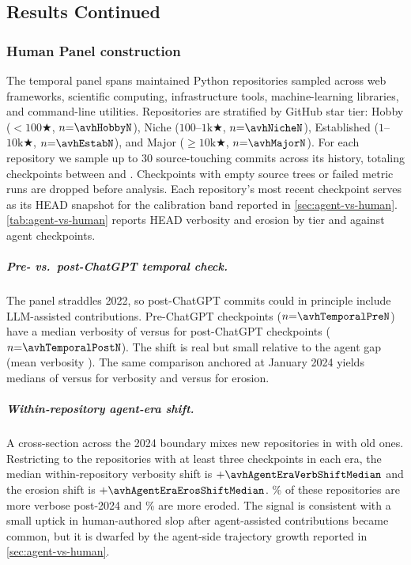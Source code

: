 \subsection{Results Continued}\label{sec:human-repo-panel}




\subsubsection{Human Panel construction}

The temporal panel spans \avhPanelN{} maintained Python repositories sampled across web frameworks, scientific computing, infrastructure tools, machine-learning libraries, and command-line utilities. Repositories are stratified by GitHub star tier: Hobby ($<100\bigstar$, $n{=}\avhHobbyN$), Niche ($100$--$1\text{k}\bigstar$, $n{=}\avhNicheN$), Established ($1$--$10\text{k}\bigstar$, $n{=}\avhEstabN$), and Major ($\geq10\text{k}\bigstar$, $n{=}\avhMajorN$). For each repository we sample up to 30 source-touching commits across its history, totaling \avhTemporalCkpts{} checkpoints between \avhPanelStartYear{} and \avhPanelEndYear{}. Checkpoints with empty source trees or failed metric runs are dropped before analysis. Each repository's most recent checkpoint serves as its HEAD snapshot for the calibration band reported in \autoref{sec:agent-vs-human}. \autoref{tab:agent-vs-human} reports HEAD verbosity and erosion by tier and against agent checkpoints.


\subparagraph{Pre- vs.\ post-ChatGPT temporal check.} The panel straddles 2022, so post-ChatGPT commits could in principle include LLM-assisted contributions. Pre-ChatGPT checkpoints ($n{=}\avhTemporalPreN$) have a median verbosity of \avhTemporalPreVerbMedian{} versus \avhTemporalPostVerbMedian{} for post-ChatGPT checkpoints ($n{=}\avhTemporalPostN$). The shift is real but small relative to the agent gap (mean verbosity \avhAgentVerbMean{}). The same comparison anchored at January 2024 yields medians of \avhAgentEraPreVerbMedian{} versus \avhAgentEraPostVerbMedian{} for verbosity and \avhAgentEraPreErosMedian{} versus \avhAgentEraPostErosMedian{} for erosion.

\subparagraph{Within-repository agent-era shift.} A cross-section across the 2024 boundary mixes new repositories in with old ones. Restricting to the \avhAgentEraBothN{} repositories with at least three checkpoints in each era, the median within-repository verbosity shift is $+\avhAgentEraVerbShiftMedian$ and the erosion shift is $+\avhAgentEraErosShiftMedian$. \avhAgentEraVerbHigherPct{}\% of these repositories are more verbose post-2024 and \avhAgentEraErosHigherPct{}\% are more eroded. The signal is consistent with a small uptick in human-authored slop after agent-assisted contributions became common, but it is dwarfed by the agent-side trajectory growth reported in \autoref{sec:agent-vs-human}.

